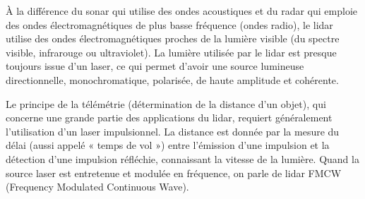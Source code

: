 \documentclass[main.tex]{subfiles}
\begin{document}
À la différence du sonar qui utilise des ondes acoustiques et du radar qui emploie des ondes électromagnétiques de plus basse fréquence (ondes radio), le lidar utilise des ondes électromagnétiques proches de la lumière visible (du spectre visible, infrarouge ou ultraviolet). La lumière utilisée par le lidar est presque toujours issue d'un laser, ce qui permet d'avoir une source lumineuse directionnelle, monochromatique, polarisée, de haute amplitude et cohérente.

Le principe de la télémétrie (détermination de la distance d'un objet), qui concerne une grande partie des applications du lidar, requiert généralement l'utilisation d'un laser impulsionnel. La distance est donnée par la mesure du délai (aussi appelé « temps de vol ») entre l'émission d'une impulsion et la détection d'une impulsion réfléchie, connaissant la vitesse de la lumière. Quand la source laser est entretenue et modulée en fréquence, on parle de lidar FMCW (Frequency Modulated Continuous Wave). 
\end{document}
